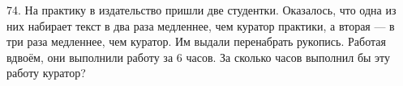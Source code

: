 74. На практику в издательство пришли две студентки. Оказалось, что одна из них набирает текст в два раза медленнее, чем куратор практики, а вторая --- в три раза медленнее, чем куратор. Им выдали перенабрать рукопись. Работая вдвоём, они выполнили работу за 6 часов. За сколько часов выполнил бы эту работу куратор?\\
